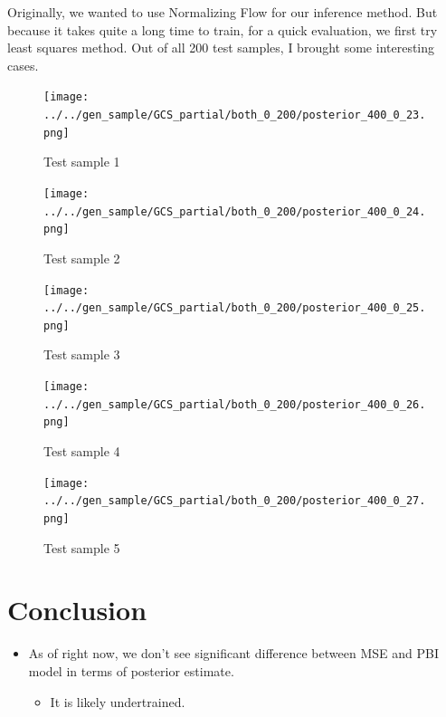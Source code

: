 \documentclass[
]{article}
\providecommand{\tightlist}{%
  \setlength{\itemsep}{0pt}\setlength{\parskip}{0pt}}\usepackage{longtable,booktabs,array}
\begin{document}
Originally, we wanted to use Normalizing Flow for our inference method.
But because it takes quite a long time to train, for a quick evaluation,
we first try least squares method. Out of all 200 test samples, I
brought some interesting cases.

\begin{figure}[H]

{\centering \texttt{[image: ../../gen\_sample/GCS\_partial/both\_0\_200/posterior\_400\_0\_23.png]}

}

\caption{Test sample 1}

\end{figure}%
\begin{figure}[H]

{\centering \texttt{[image: ../../gen\_sample/GCS\_partial/both\_0\_200/posterior\_400\_0\_24.png]}

}

\caption{Test sample 2}

\end{figure}%
\begin{figure}[H]

{\centering \texttt{[image: ../../gen\_sample/GCS\_partial/both\_0\_200/posterior\_400\_0\_25.png]}

}

\caption{Test sample 3}

\end{figure}%
\begin{figure}[H]

{\centering \texttt{[image: ../../gen\_sample/GCS\_partial/both\_0\_200/posterior\_400\_0\_26.png]}

}

\caption{Test sample 4}

\end{figure}%
\begin{figure}[H]

{\centering \texttt{[image: ../../gen\_sample/GCS\_partial/both\_0\_200/posterior\_400\_0\_27.png]}

}

\caption{Test sample 5}

\end{figure}%

\section{Conclusion}\label{conclusion}

\begin{itemize}
\tightlist
\item
  As of right now, we don't see significant difference between MSE and
  PBI model in terms of posterior estimate.

  \begin{itemize}
  \tightlist
  \item
    It is likely undertrained.
  \end{itemize}
\end{itemize}
\end{document}

